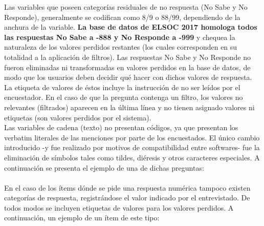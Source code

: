 \documentclass[12pt]{report}
\begin{document}
Las variables que poseen categorías residuales de no respuesta (No Sabe y No Responde), generalmente se codifican como 8/9 o 88/99, dependiendo de la anchura de la variable. \textbf{La base de datos de ELSOC 2017 homologa todos las respuestas No Sabe a -888 y No Responde a -999} y chequea la naturaleza de los valores perdidos restantes (los cuales corresponden en su totalidad a la aplicación de filtros). Las respuestas No Sabe y No Responde no fueron eliminadas ni transformadas en valores perdidos en la base de datos,  de modo que los usuarios deben decidir qué hacer con dichos valores de respuesta. La etiqueta de valores de éstos incluye la instrucción de no ser leídos por el encuestador. En el caso de que la pregunta contenga un filtro, los valores no relevantes (filtrados) aparecen en la última línea y no tienen asignado valores ni etiquetas (son valores perdidos por el sistema).\\

Las variables de cadena (texto) no presentan códigos, ya que presentan los verbatim literales de las menciones por parte de los encuestados. El único cambio introducido -y fue realizado por motivos de compatibilidad entre softwares- fue la eliminación de símbolos tales como tildes, diéresis y otros caracteres especiales. A continuación se presenta el ejemplo de una de dichas preguntas:\\

\noindent {}
\vspace{0.1cm}\\

En el caso de los ítems dónde se pide una respuesta numérica tampoco existen categorías de respuesta, registrándose el valor indicado por el entrevistado. De todos modos se incluyen etiquetas de valores para los valores perdidos. A continuación, un ejemplo de un ítem de este tipo:\\
\end{document}
